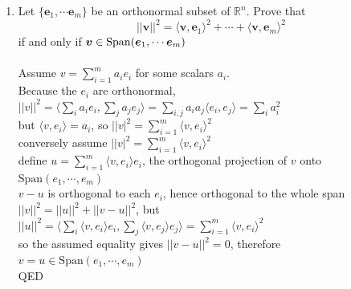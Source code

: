\documentclass{article}
\begin{document}
{{\begin{enumerate}
\begin{enumerate}[a.]
\\$u_2=x^2-\langle x^2,q_0\rangle q_0=x^2-\frac{1}{2}$
\\$\langle u_2,u_2\rangle=\frac{3\sqrt{\pi}}{4}-2\cdot\frac{1}{2}\frac{\sqrt{\pi}}{2}+\frac{1}{4}\sqrt{pi}=\frac{\sqrt{\pi}}{2}$
\\$||u_2||=\frac{\pi^{1/4}}{\sqrt{2}}$
\\$q_2=\frac{u_2}{||u_2||}=\frac{\sqrt{2}}{\pi^{1/4}}(x^2-\frac{1}{2})$
\\$q_0=\pi^{-1/4}$, $q_1=\frac{\sqrt{2}}{\pi^{1/4}}x$, $q_2=\frac{\sqrt{2}}{\pi^{1/4}}(x^2-\frac{1}{2})$
\\$g=\sum^2_{k=0}q_k(1)q_k$
\\because for any $f=\sum\langle f,q_k\rangle 1_k$ we get $\langle f,g\rangle=\sum\langle f,q_k\rangle q_k(1)=f(1)$
\\$q_0(1)=\pi^{-1/4}$, $q_1(1)=\frac{\sqrt{2}}{\pi^{1/4}}$, $q_2(1)=\frac{\sqrt{2}}{2\pi^{1/4}}$
\\$g=q_0(1)q_0+q_1(1)q_1+q_2(1)q_2=\pi^{-1/2}(x^2+2x+\frac{1}{2})$
\\$g(x)=\pi^{-1/2}(x^2+2x+\frac{1}{2})$
\end{enumerate}

\newpage\item Let $\{\bm{e}_1,\cdots\bm{e}_m\}$ be an orthonormal subset of $\mathbb{R}^n$. Prove that 
$$||\bm{v}||^2=\langle \bm{v},\bm{e}_1\rangle ^2+\cdots +\langle \bm{v},\bm{e}_m\rangle ^2$$
if and only if $\bm{v}\in{\rm Span}(\bm{e}_1,\cdots\bm{e}_m)$
\\
\\Assume $v=\sum^m_{i=1}a_ie_i$ for some scalars $a_i$.
\\Because the $e_i$ are orthonormal, $||v||^2=\langle\sum_ia_ie_i,\sum_ja_je_j\rangle=\sum_{i,j}a_ia_j\langle e_i,e_j\rangle=\sum_i a_i^2$
\\but $\langle v,e_i\rangle=a_i$, so $||v|^2=\sum^m_{i=1}\langle v,e_i\rangle^2$
\\conversely assume $||v|^2=\sum^m_{i=1}\langle v,e_i\rangle^2$
\\define $u=\sum^m_{i=1}\langle v,e_i\rangle e_i$, the orthogonal projection of $v$ onto $\textrm{Span}(e_1,\cdots,e_m)$
\\$v-u$ is orthogonal to each $e_i$, hence orthogonal to the whole span
\\$||v||^2=||u||^2+||v-u||^2$, but $||u||^2=\langle\sum_i\langle v,e_i\rangle e_i,\sum_j\langle v,e_j\rangle e_j\rangle=\sum^m_{i=1}\langle v,e_i\rangle^2$
\\so the assumed equality gives $||v-u||^2=0$, therefore $v=u\in\textrm{Span}(e_1,\cdots,e_m)$
\\QED


\end{enumerate}}}
\end{document}
